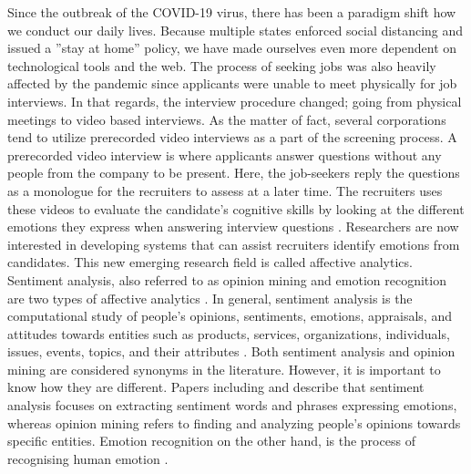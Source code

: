 Since the outbreak of the COVID-19 virus, there has been a paradigm shift how we conduct our daily lives. Because multiple states enforced social distancing and issued a ''stay at home'' policy, we have made ourselves even more dependent on technological tools and the web. The process of seeking jobs was also heavily affected by the pandemic since applicants were unable to meet physically for job interviews. In that regards, the interview procedure changed; going from physical meetings to video based interviews. As the matter of fact, several corporations tend to utilize prerecorded video interviews as a part of the screening process. A prerecorded video interview is where applicants answer questions without any people from the company to be present. Here, the job-seekers reply the questions as a monologue for the recruiters to assess at a later time. The recruiters uses these videos to evaluate the candidate's cognitive skills by looking at the different emotions they express when answering interview questions \cite{JOSHI20201316}. Researchers are now interested in developing systems that can assist recruiters identify emotions from candidates. This new emerging research field is called affective analytics. \\

Sentiment analysis, also referred to as opinion mining and emotion recognition are two types of affective analytics \cite{MSA_review2_GANDHI2023424}. In general, sentiment analysis is the computational study of people’s opinions, sentiments, emotions, appraisals, and attitudes towards entities such as products, services, organizations, individuals, issues, events, topics, and their attributes \cite{SA-definition} \cite{HP-integration-project}. Both sentiment analysis and opinion mining are considered synonyms in the literature. However, it is important to know how they are different. Papers including \cite{SA-history-MANTYLA201816} and \cite{Student-feedback-MOOCS-app11093986} describe that sentiment analysis focuses on extracting sentiment words and phrases expressing emotions, whereas opinion mining refers to finding and analyzing people's opinions towards specific entities. Emotion recognition on the other hand, is the process of recognising human emotion \cite{MSA_review2_GANDHI2023424}.  \\ 

